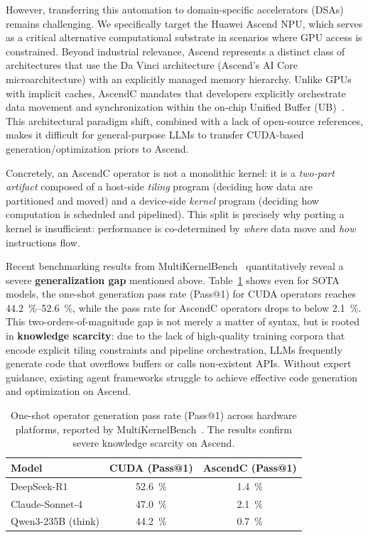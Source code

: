 \documentclass{article}
\theoremstyle{plain}
\theoremstyle{definition}
\theoremstyle{remark}
\begin{document}
However, transferring this automation to domain-specific accelerators (DSAs) remains challenging. 
We specifically target the Huawei Ascend NPU, which serves as a critical alternative computational substrate in scenarios where GPU access is constrained. 
Beyond industrial relevance, Ascend represents a distinct class of architectures that use the Da Vinci architecture (Ascend's AI Core microarchitecture) with an explicitly managed memory hierarchy. 
Unlike GPUs with implicit caches, AscendC mandates that developers explicitly orchestrate data movement and synchronization within the on-chip Unified Buffer (UB)~\cite{zhou2025squeezing}. 
This architectural paradigm shift, combined with a lack of open-source references, makes it difficult for general-purpose LLMs to transfer CUDA-based generation/optimization priors to Ascend.

Concretely, an AscendC operator is not a monolithic kernel: it is a \emph{two-part artifact} composed of a host-side \emph{tiling} program (deciding how data are partitioned and moved) and a device-side \emph{kernel} program (deciding how computation is scheduled and pipelined). This split is precisely why porting a kernel is insufficient: performance is co-determined by \emph{where} data move and \emph{how} instructions flow.

Recent benchmarking results from MultiKernelBench~\cite{wen2025multikernelbench} quantitatively reveal a severe \textbf{generalization gap} mentioned above. 
Table~\ref{tab:pass_rate_gap} shows even for SOTA models, the one-shot generation pass rate (Pass@1) for CUDA operators reaches \SIrange{44.2}{52.6}{\percent}, while the pass rate for AscendC operators drops to below \SI{2.1}{\percent}. 
This two-orders-of-magnitude gap is not merely a matter of syntax, but is rooted in \textbf{knowledge scarcity}: due to the lack of high-quality training corpora that encode explicit tiling constraints and pipeline orchestration, LLMs frequently generate code that overflows buffers or calls non-existent APIs. 
Without expert guidance, existing agent frameworks struggle to achieve effective code generation and optimization on Ascend.

\begin{table}[htbp]
\centering
\caption{One-shot operator generation pass rate (Pass@1) across hardware platforms, reported by MultiKernelBench~\cite{wen2025multikernelbench}. The results confirm severe knowledge scarcity on Ascend.}
\label{tab:pass_rate_gap}
\begin{tabular}{lcc}
\toprule
\textbf{Model} & \textbf{CUDA (Pass@1)} & \textbf{AscendC (Pass@1)} \\
\midrule
DeepSeek-R1 & \SI{52.6}{\percent} & \SI{1.4}{\percent}  \\
Claude-Sonnet-4 & \SI{47.0}{\percent} & \SI{2.1}{\percent}  \\
Qwen3-235B (think) & \SI{44.2}{\percent} & \SI{0.7}{\percent}  \\
\bottomrule
\end{tabular}%
\end{table}
\end{document}
